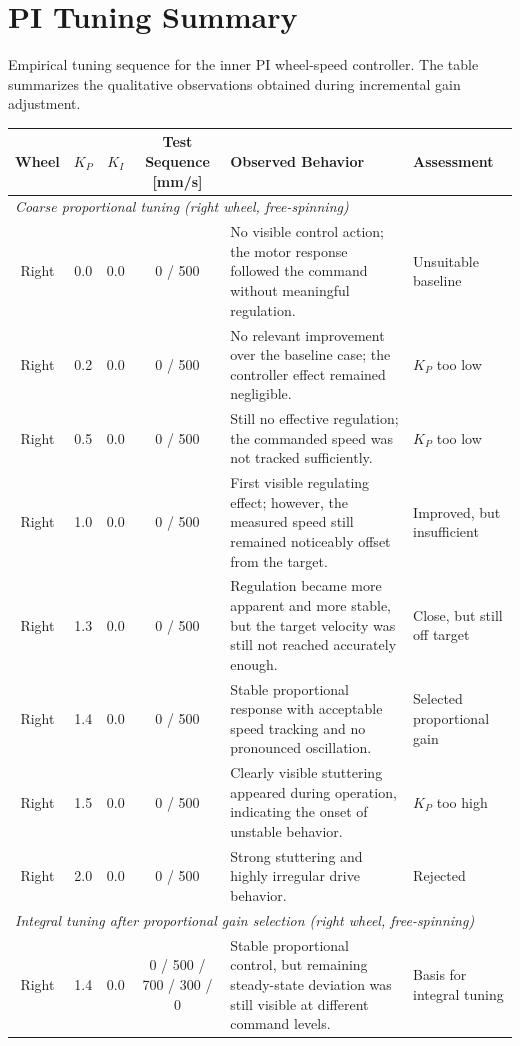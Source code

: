 \section{PI Tuning Summary}

Empirical tuning sequence for the inner PI wheel-speed controller. The table summarizes the qualitative observations obtained during incremental gain adjustment.
\begin{table}[ht]
\centering
\label{tab:pi_tuning_summary}
\renewcommand{\arraystretch}{1.2}
\begin{tabularx}{\textwidth}{c c c c X X}
\hline
\textbf{Wheel} & \textbf{$K_P$} & \textbf{$K_I$} & \textbf{Test Sequence [mm/s]} & \textbf{Observed Behavior} & \textbf{Assessment} \\
\hline
\multicolumn{6}{l}{\textit{Coarse proportional tuning (right wheel, free-spinning)}} \\
\hline
Right & 0.0 & 0.0 & 0 / 500 & No visible control action; the motor response followed the command without meaningful regulation. & Unsuitable baseline \\
Right & 0.2 & 0.0 & 0 / 500 & No relevant improvement over the baseline case; the controller effect remained negligible. & $K_P$ too low \\
Right & 0.5 & 0.0 & 0 / 500 & Still no effective regulation; the commanded speed was not tracked sufficiently. & $K_P$ too low \\
Right & 1.0 & 0.0 & 0 / 500 & First visible regulating effect; however, the measured speed still remained noticeably offset from the target. & Improved, but insufficient \\
Right & 1.3 & 0.0 & 0 / 500 & Regulation became more apparent and more stable, but the target velocity was still not reached accurately enough. & Close, but still off target \\
Right & 1.4 & 0.0 & 0 / 500 & Stable proportional response with acceptable speed tracking and no pronounced oscillation. & Selected proportional gain \\
Right & 1.5 & 0.0 & 0 / 500 & Clearly visible stuttering appeared during operation, indicating the onset of unstable behavior. & $K_P$ too high \\
Right & 2.0 & 0.0 & 0 / 500 & Strong stuttering and highly irregular drive behavior. & Rejected \\
\hline
\multicolumn{6}{l}{\textit{Integral tuning after proportional gain selection (right wheel, free-spinning)}} \\
\hline
Right & 1.4 & 0.0 & 0 / 500 / 700 / 300 / 0 & Stable proportional control, but remaining steady-state deviation was still visible at different command levels. & Basis for integral tuning \\

\end{tabularx}
\end{table}
